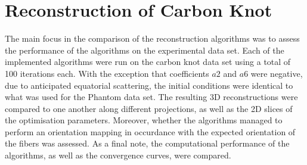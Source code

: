\section{Reconstruction of Carbon Knot}


The main focus in the comparison of the reconstruction algorithms was to assess the performance of the algorithms on the experimental data set.
Each of the implemented algorithms were run on the carbon knot data set using a total of 100 iterations each.
\noindent
With the exception that coefficients $a2$ and $a6$ were negative, due to anticipated equatorial scattering, the initial conditions were identical to what was used for the Phantom data set.
The resulting 3D reconstructions were compared to one another along different projections, as well as the 2D slices of the optimisation parameters.
Moreover, whether the algorithms managed to perform an orientation mapping in occurdance with the expected orientation of the fibers was assessed.
As a final note, the computational performance of the algorithms, as well as the convergence curves, were compared.